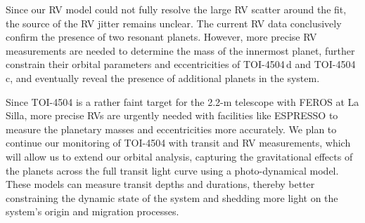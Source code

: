 \documentclass[twocolumn,twocolappendix]{aastex631}
\begin{document}
Since our RV model could not fully resolve the large RV scatter around the fit, the source of the RV jitter remains unclear. The current RV data conclusively confirm the presence of two resonant planets. However, more precise RV measurements are needed to determine the mass of the innermost planet, further constrain their orbital parameters and eccentricities of TOI-4504\,d and TOI-4504\,c, and eventually reveal the presence of additional planets in the system.

Since TOI-4504 is a rather faint target for the 2.2-m telescope with FEROS at La Silla, more precise RVs are urgently needed with facilities like ESPRESSO \citep{Pepe2021} to measure the planetary masses and eccentricities more accurately. We plan to continue our monitoring of TOI-4504 with transit and RV measurements, which will allow us to extend our orbital analysis, capturing the gravitational effects of the planets across the full transit light curve using a photo-dynamical model. These models can measure transit depths and durations, thereby better constraining the dynamic state of the system and shedding more light on the system's origin and migration processes.




\end{document}
